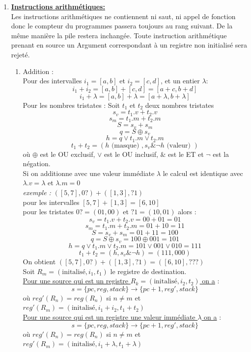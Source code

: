 \documentclass[a4paper,french, 12pt]{article}
\begin{document}
\begin{enumerate}
		\item \textbf{\underline{Instructions arithmétiques:}}\\
		Les instructions arithmétiques ne contiennent ni saut, ni appel de fonction donc le compteur du programmes passera toujours au rang suivant.
		 De la même manière la pile restera inchangée.
		Toute instruction arithmétique prenant en source un Argument correspondant à un registre non initialisé sera rejeté.
		\begin{enumerate}
			\item Addition :\\
			Pour des intervalles $i_1 = [a,b]$ et $i_2 = [c,d]$, et un entier $\lambda$:
			$$i_1 + i_2 = [a,b] + [c,d] = [a+c, b+d]$$
			$$i_1 + \lambda = [a,b] + \lambda =[a +\lambda,b + \lambda]$$
			Pour les nombres tristates :  Soit $t_1$ et $t_2$ deux nombres tristates
			$$ s_v = t_1.v + t_2.v$$
			$$ s_m = t_1.m + t_2.m$$
			$$ S = s_v + s_m$$
			$$ q = S \oplus s_v $$
			$$ h = q \lor t_1.m \lor t_2.m $$
			$$ t_1 + t_2 = (h \text{ (masque) },s_v \& \neg h \text{ (valeur) }) $$
			où $\oplus$ est le OU exclusif, $\lor$ est le OU inclusif, $\&$ est le ET et $\neg$ est la négation.\\
			Si on additionne avec une valeur immédiate $\lambda$ le calcul est identique avec $\lambda.v = \lambda$ et $\lambda.m = 0$\\
			\textit{exemple :} $([5,7],0? ) + ([1,3],?1)$\\
			pour les intervalles $[5,7] + [1,3] = [6,10]$\\
			pour les tristates $ 0? = (01,00) $ et $?1 = (10,01)$ alors :
			$$ s_v = t_1.v + t_2.v = 00 + 01 = 01 $$
			$$ s_m = t_1.m + t_2.m = 01 + 10 = 11 $$
			$$ S = s_v + s_m = 01 + 11 = 100 $$
			$$ q = S \oplus s_v = 100 \oplus 001 = 101 $$
			$$ h = q \lor t_1.m \lor t_2.m = 101 \lor 001 \lor 010 = 111 $$
			$$ t_1 + t_2 = (h ,s_v \& \neg h) = (111, 000)$$
			On obtient $([5,7],0? ) + ([1,3],? 1) = ([6,10],???)$\\

			Soit $R_m = (\text{initalisé},i_1,t_1)$ le registre de destination.\\
			\underline{Pour une source qui est un registre  $R_k = (\text{initalisé},i_2,t_2)$ on a} :
			$$ s = \{pc, reg , stack\} \to \{pc + 1, reg', stack\} $$
			où $reg'(R_n) = reg(R_n)$ si $n\neq m$ et $reg'(R_m)=(\text{initalisé},i_1+i_2,t_1+t_2)$\\

			\underline{Pour une source qui est un registre une valeur immédiate $\lambda$ on a} :
			$$ s = \{pc, reg , stack\} \to \{pc + 1, reg', stack\} $$
			où $reg'(R_n) = reg(R_n)$ si $n\neq m$ et $reg'(R_m)=(\text{initalisé},i_1+\lambda,t_1+\lambda)$\\


\end{enumerate}
\end{enumerate}
\end{document}
